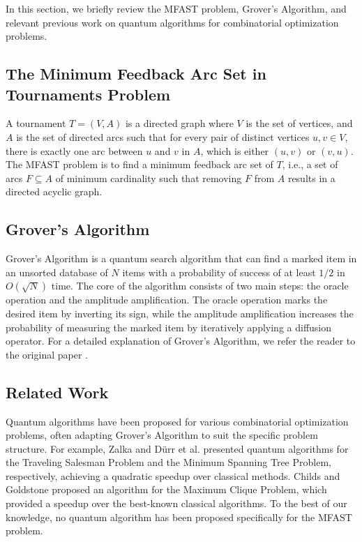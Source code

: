 In this section, we briefly review the MFAST problem, Grover's Algorithm, and relevant previous work on quantum algorithms for combinatorial optimization problems.

\subsection{The Minimum Feedback Arc Set in Tournaments Problem}

A tournament $T = (V, A)$ is a directed graph where $V$ is the set of vertices, and $A$ is the set of directed arcs such that for every pair of distinct vertices $u, v \in V$, there is exactly one arc between $u$ and $v$ in $A$, which is either $(u, v)$ or $(v, u)$. The MFAST problem is to find a minimum feedback arc set of $T$, i.e., a set of arcs $F \subseteq A$ of minimum cardinality such that removing $F$ from $A$ results in a directed acyclic graph.

\subsection{Grover's Algorithm}

Grover's Algorithm is a quantum search algorithm that can find a marked item in an unsorted database of $N$ items with a probability of success of at least $1/2$ in $O(\sqrt{N})$ time. The core of the algorithm consists of two main steps: the oracle operation and the amplitude amplification. The oracle operation marks the desired item by inverting its sign, while the amplitude amplification increases the probability of measuring the marked item by iteratively applying a diffusion operator. For a detailed explanation of Grover's Algorithm, we refer the reader to the original paper \cite{grover1996fast}.

\subsection{Related Work}

Quantum algorithms have been proposed for various combinatorial optimization problems, often adapting Grover's Algorithm to suit the specific problem structure. For example, Zalka \cite{zalka1999grover} and Dürr et al. \cite{durr1996quantum} presented quantum algorithms for the Traveling Salesman Problem and the Minimum Spanning Tree Problem, respectively, achieving a quadratic speedup over classical methods. Childs and Goldstone \cite{childs2000quantum} proposed an algorithm for the Maximum Clique Problem, which provided a speedup over the best-known classical algorithms. To the best of our knowledge, no quantum algorithm has been proposed specifically for the MFAST problem.

